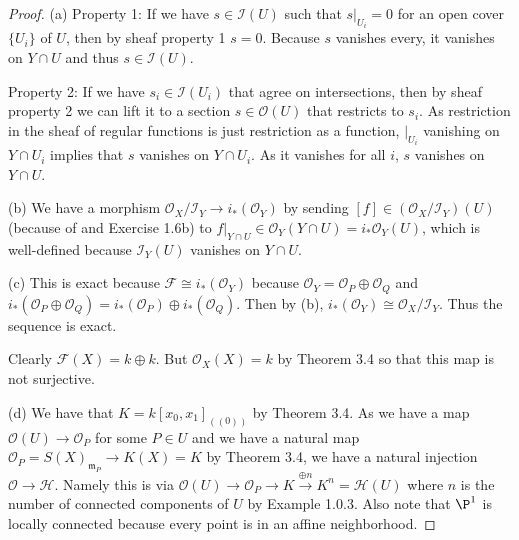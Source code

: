 \begin{proof}
	(a) Property 1: If we have $s \in \mathscr{I}(U) $ such that $s|_{U_i} = 0 $ for an open cover $\{U_i\}   $ of $U $, then by sheaf property 1 $s=0 $.
	Because $s$ vanishes every, it vanishes on $Y \cap U $ and thus $s \in \mathscr{I}(U) $.

	Property 2: If we have $s_i \in \mathscr{I}(U_i) $ that agree on intersections, then by sheaf property 2 we can lift it to a section $s \in \mathcal{O}(U) $ that restricts to $s_i $.
	As restriction in the sheaf of regular functions is just restriction as a function, $|_{U_i} $ vanishing on $Y\cap U_i $ implies that $s $ vanishes on $Y\cap U_i $.
	As it vanishes for all $i $, $s $ vanishes on $Y \cap U $.

	(b) We have a morphism $\mathcal{O}_X / \mathscr{I}_Y \to i_\ast(\mathcal{O}_Y) $ by sending $[f] \in (\mathcal{O}_X / \mathscr{I}_Y)(U) $ (because of  and Exercise 1.6b) to $f|_{Y\cap U} \in \mathcal{O}_Y(Y \cap U) = i_\ast\mathcal{O}_Y(U) $, which is well-defined because $\mathscr{I}_Y(U) $ vanishes on $Y\cap U $.

	(c) This is exact because $\mathscr{F} \cong i_\ast(\mathcal{O}_Y)  $ because $\mathcal{O}_Y = \mathcal{O}_P \oplus \mathcal{O}_Q $ and $i_\ast(\mathcal{O}_P \oplus \mathcal{O}_Q) = i_\ast(\mathcal{O}_P) \oplus i_\ast(\mathcal{O}_Q)$.
	Then by (b), $i_\ast(\mathcal{O}_Y) \cong \mathcal{O}_X / \mathscr{I}_Y $.
	Thus the sequence is exact.

	Clearly $\mathscr{F}(X) = k \oplus k $.
	But $\mathcal{O}_X(X) = k $ by Theorem 3.4 so that this map is not surjective.

	(d) We have that $K = k[x_{0},x_{1}]_{((0))}$ by Theorem 3.4. 
	As we have a map $\mathcal{O}(U) \to \mathcal{O}_P $ for some $P \in U $ and we have a natural map $\mathcal{O}_P = S(X)_{\mathfrak{m}_P} \to K(X) = K $ by Theorem 3.4, we have a natural injection $\mathcal{O}\to \mathscr{H} $.
	Namely this is via $\mathcal{O}(U) \to \mathcal{O}_P \to K \xrightarrow{\oplus n} K^n = \mathscr{H}(U) $ where $n $ is the number of connected components of $U $ by Example 1.0.3.
	Also note that $\P^1 $ is locally connected because every point is in an affine neighborhood.


\end{proof}
